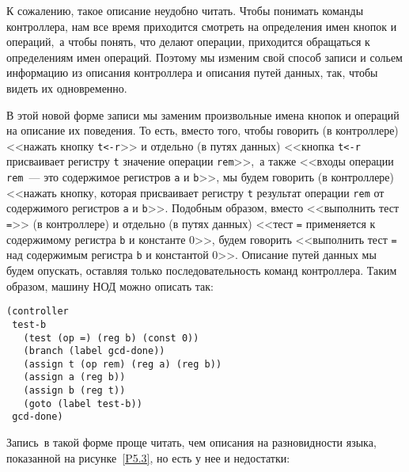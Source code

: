 К сожалению, такое описание неудобно читать.  Чтобы понимать
команды контроллера, нам все время приходится смотреть на определения
имен кнопок и операций,~а чтобы понять, что делают операции,
приходится обращаться к определениям имен операций.  Поэтому мы изменим
свой способ записи и сольем информацию из описания контроллера и описания путей
данных, так, чтобы видеть их одновременно.

В этой новой форме записи мы заменим
произвольные имена кнопок и операций на описание их поведения. 
То есть, вместо того, чтобы говорить (в контроллере) <<нажать кнопку
{\tt t<-r}>> и отдельно (в путях данных) <<кнопка
{\tt t<-r} присваивает регистру {\tt t} значение
операции {\tt rem}>>,~а также <<входы операции
{\tt rem}~--- это  содержимое регистров {\tt a} и
{\tt b}>>, мы будем говорить (в контроллере) <<нажать кнопку,
которая  присваивает регистру {\tt t} результат операции
{\tt rem} от содержимого регистров {\tt a} и
{\tt b}>>.
Подобным образом, вместо <<выполнить тест
{\tt =}>> (в контроллере) и отдельно (в путях
данных) <<тест {\tt =} применяется к содержимому регистра
{\tt b} и константе 0>>, будем говорить <<выполнить тест
{\tt =} над содержимым регистра {\tt b} и константой
0>>. Описание путей данных мы будем опускать, оставляя только
последовательность команд контроллера.  Таким образом, машину НОД
можно описать так:

\pagebreak

\begin{Verbatim}[fontsize=\small]
(controller 
 test-b
   (test (op =) (reg b) (const 0))
   (branch (label gcd-done))
   (assign t (op rem) (reg a) (reg b))
   (assign a (reg b))
   (assign b (reg t))
   (goto (label test-b))
 gcd-done)
\end{Verbatim}

Запись~в такой форме проще читать, чем описания на
разновидности языка, показанной на рисунке~\ref{P5.3}, но
есть у нее и недостатки: 

